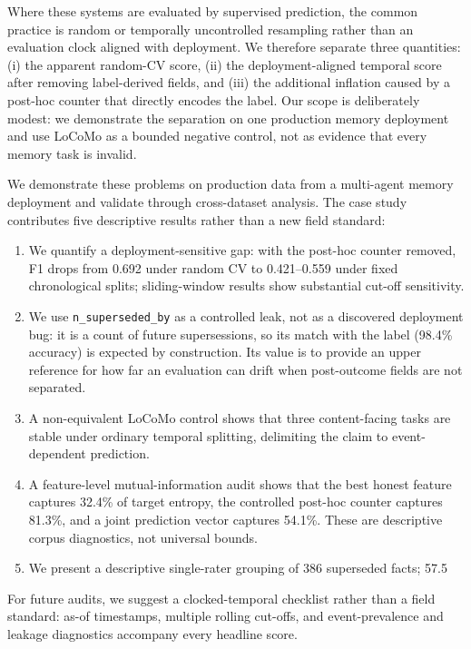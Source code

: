 \documentclass[sigconf,nonacm]{acmart}
\begin{document}
Where these systems are evaluated by supervised prediction, the common practice is random or temporally uncontrolled resampling rather than an evaluation clock aligned with deployment. We therefore separate three quantities: (i) the apparent random-CV score, (ii) the deployment-aligned temporal score after removing label-derived fields, and (iii) the additional inflation caused by a post-hoc counter that directly encodes the label. Our scope is deliberately modest: we demonstrate the separation on one production memory deployment and use LoCoMo as a bounded negative control, not as evidence that every memory task is invalid.

We demonstrate these problems on production data from a multi-agent memory deployment and validate through cross-dataset analysis. The case study contributes five descriptive results rather than a new field standard:
\begin{enumerate}
\item We quantify a deployment-sensitive gap: with the post-hoc counter removed, F1 drops from 0.692 under random CV to 0.421--0.559 under fixed chronological splits; sliding-window results show substantial cut-off sensitivity.
\item We use \texttt{n\_superseded\_by} as a controlled leak, not as a discovered deployment bug: it is a count of future supersessions, so its match with the label (98.4\% accuracy) is expected by construction. Its value is to provide an upper reference for how far an evaluation can drift when post-outcome fields are not separated.
\item A non-equivalent LoCoMo control shows that three content-facing tasks are stable under ordinary temporal splitting, delimiting the claim to event-dependent prediction.
\item A feature-level mutual-information audit shows that the best honest feature captures 32.4\% of target entropy, the controlled post-hoc counter captures 81.3\%, and a joint prediction vector captures 54.1\%. These are descriptive corpus diagnostics, not universal bounds.
\item We present a descriptive single-rater grouping of 386 superseded facts; 57.5%
\end{enumerate}

For future audits, we suggest a clocked-temporal checklist rather than a field standard: as-of timestamps, multiple rolling cut-offs, and event-prevalence and leakage diagnostics accompany every headline score.
\end{document}
